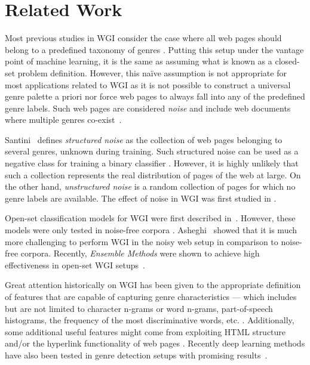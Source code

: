 \documentclass{llncs}
\begin{document}
\section{Related Work}\label{sec:pre_work}
Most previous studies in WGI consider the case where all web pages should belong to a predefined taxonomy of genres \cite{Lim2005,santini2007automatic,kanaris2009learning,jebari2014pure_URL}. Putting this setup under the vantage point of machine learning, it is the same as assuming what is known as a closed-set problem definition. However, this naïve assumption is not appropriate for most applications related to WGI as it is not possible to construct a universal genre palette a priori nor force web pages to always fall into any of the predefined genre labels. Such web pages are considered \textit{noise} and include web documents where multiple genres co-exist~\cite{santini2011cross,levering2008using}. 

Santini~\cite{santini2011cross} defines \textit{structured noise} as the collection of web pages belonging to several genres, unknown during training. Such structured noise can be used as a negative class for training a binary classifier \cite{Vidulin2007}. However, it is highly unlikely that such a collection represents the real distribution of pages of the web at large. On the other hand, \textit{unstructured noise} is a random collection of pages \cite{santini2011cross} for which no genre labels are available. The effect of noise in WGI was first studied in \cite{shepherd2004cybergenre,kennedy2005automatic,dong2006binary,levering2008using}.

Open-set classification models for WGI were first
described in~\cite{pritsos2013open,stubbe2007genre}. However, these models were only tested in noise-free corpora \cite{pritsos2015clef}. Asheghi~\cite{Asheghi2015} showed that it is much more challenging to perform WGI
in the noisy web setup in comparison to noise-free corpora. Recently, \textit{Ensemble Methods} were shown to achieve high effectiveness in open-set WGI setups~\cite{pritsos2018open}.

Great attention historically on WGI has been given to the appropriate definition of features that are capable of capturing genre characteristics --- which includes but are not limited to character n-grams or word n-grams, part-of-speech histograms, the frequency of the most discriminative words, etc.  \cite{kanaris2009learning,kumari2014web,levering2008using,Lim2005,mason2009n,onan2018ensemble,petrenz2011stable,sharoff2010web}.  Additionally, some additional useful features might come from exploiting HTML structure and/or the hyperlink functionality of web pages \cite{abramson2012_URL,asheghi2014semi,jebari2014pure_URL,priyatam2013don_URL,zhu2011enhance}. Recently deep learning methods have also been tested in genre detection setups with promising results~\cite{worsham2018genre}. 
\end{document}
